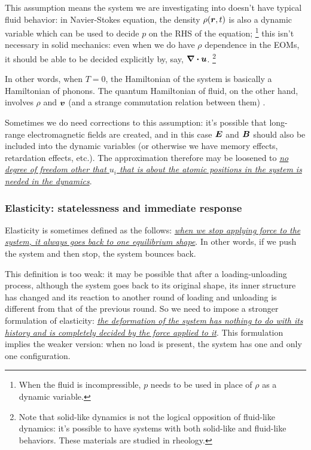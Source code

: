 \documentclass[hyperref, a4paper]{article}
\begin{document}
This assumption means the system we are investigating into 
doesn't have typical fluid behavior:
in Navier-Stokes equation, 
the density $\rho(\vb*{r}, t)$ is also a dynamic variable 
which can be used to decide $p$ on the RHS of the equation;%
\footnote{
    When the fluid is incompressible, 
    $p$ needs to be used in place of $\rho$ as a dynamic variable.
}
this isn't necessary in solid mechanics: 
even when we do have $\rho$ dependence in the EOMs, 
it should be able to be decided explicitly by, say, $\div{\vb*{u}}$.%
\footnote{
    Note that solid-like dynamics is not the logical opposition of fluid-like dynamics:
    it's possible to have systems with both solid-like and fluid-like behaviors.
    These materials are studied in rheology.
}

In other words, when $T = 0$, the Hamiltonian of the system is basically a Hamiltonian of phonons.
The quantum Hamiltonian of fluid,
on the other hand,
involves $\rho$ and $\vb*{v}$ (and a strange commutation relation between them) \cite{wiegmann2005}.

Sometimes we do need corrections to this assumption:
it's possible that long-range electromagnetic fields are created,
and in this case $\vb*{E}$ and $\vb*{B}$ should also be included into 
the dynamic variables (or otherwise we have memory effects, retardation effects, etc.).
The approximation therefore may be loosened to 
\ul{\emph{no degree of freedom other that $u_i$ that is about the atomic positions in the system 
is needed in the dynamics}}.

\subsubsection{Elasticity: statelessness and immediate response}\label{sec:elasticity-def}

Elasticity is sometimes defined as the follows:
\ul{\emph{when we stop applying force to the system,
it always goes back to one equilibrium shape}}.
In other words, 
if we push the system and then stop,
the system bounces back.

This definition is too weak:
it may be possible that after a loading-unloading process,
although the system goes back to its original shape,
its inner structure has changed 
and its reaction to another round of loading and unloading 
is different from that of the previous round.
So we need to impose a stronger formulation of elasticity:
\ul{\emph{the deformation of the system has nothing to do 
with its history 
and is completely decided by the force applied to it}}.
This formulation implies the weaker version:
when no load is present,
the system has one and only one configuration. 
\end{document}

